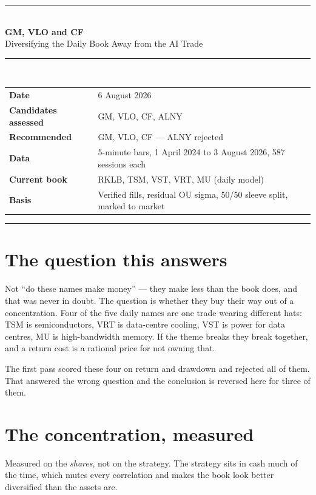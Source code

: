 \documentclass[11pt]{article}
\begin{document}
{\color{bcgold}\rule{\textwidth}{1.6pt}}\\[0.3cm]
{\color{bcnavy}\huge\bfseries GM, VLO and CF}\\[0.15cm]
{\color{bcblue}\Large Diversifying the Daily Book Away from the AI Trade}\\[0.35cm]
{\color{bcgold}\rule{\textwidth}{0.8pt}}\\[0.35cm]

\begin{tabular}{@{}ll@{}}
\textbf{Date} & 6 August 2026 \\
\textbf{Candidates assessed} & GM, VLO, CF, ALNY \\
\textbf{Recommended} & GM, VLO, CF --- ALNY rejected \\
\textbf{Data} & 5-minute bars, 1 April 2024 to 3 August 2026, 587 sessions each \\
\textbf{Current book} & RKLB, TSM, VST, VRT, MU (daily model) \\
\textbf{Basis} & Verified fills, residual OU sigma, 50/50 sleeve split, marked to market \\
\end{tabular}

\vspace{0.6em}
{\color{bcrule}\rule{\textwidth}{0.6pt}}

\section{The question this answers}

Not ``do these names make money'' --- they make less than the book does, and that was never in
doubt. The question is whether they buy their way out of a concentration. Four of the five daily
names are one trade wearing different hats: TSM is semiconductors, VRT is data-centre cooling,
VST is power for data centres, MU is high-bandwidth memory. If the theme breaks they break
together, and a return cost is a rational price for not owning that.

The first pass scored these four on return and drawdown and rejected all of them. That answered
the wrong question and the conclusion is reversed here for three of them.

\section{The concentration, measured}

Measured on the \emph{shares}, not on the strategy. The strategy sits in cash much of the time,
which mutes every correlation and makes the book look better diversified than the assets are.
\end{document}
